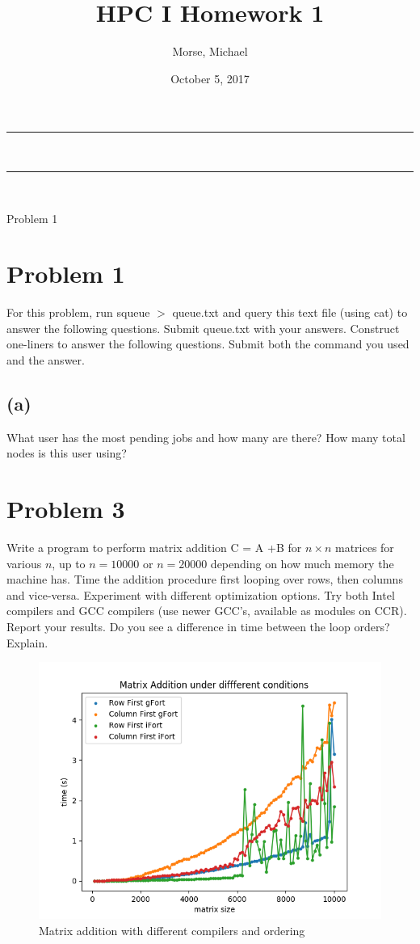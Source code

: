 \documentclass[12pt]{article}
\title{HPC I Homework 1}
\author{Morse, Michael}
\date{October 5, 2017}
\makeatletter
\newcommand{\nline}{\rule{\linewidth}{0.5pt}}
\theoremstyle{plain}
\theoremstyle{definition}
\renewcommand{\maketitle}{
\begin{center}
\nline\\
\vspace{2ex}
{\huge \textsc{\@title}}
\nline\\
{\large\textsc{\@author \hfill \@date}}
\vspace{4ex}
\end{center}
}
\makeatother
\begin{document}
\maketitle

Problem 1

\section*{Problem 1}
For this problem, run squeue $>$ queue.txt and query this text file (using cat) to answer
the following questions. Submit queue.txt with your answers. Construct one-liners to
answer the following questions. Submit both the command you used and the answer.
\subsection*{(a)}
What user has the most pending jobs and how many are there? How many total
nodes is this user using?


\section*{Problem 3}
Write a program to perform matrix addition C = A +B for $n \times n$ matrices for various $n$,
up to $n = 10000$ or $n = 20000$ depending on how much memory the machine has. Time
the addition procedure first looping over rows, then columns and vice-versa. Experiment
with different optimization options. Try both Intel compilers and GCC compilers (use
newer GCC’s, available as modules on CCR). Report your results. Do you see a difference
in time between the loop orders? Explain.

\begin{figure}
\label{fig:problem3}
\includegraphics[scale=0.7]{problem3.png}
\caption{Matrix addition with different compilers and ordering}
\end{figure}
\end{document}
